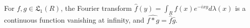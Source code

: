 For $f, g \in \mathfrak{L}_1(R)$, the Fourier transform $\hat{f}(y) = \int_R f(x) e^{-ixy} d\lambda(x)$ is a continuous function vanishing at infinity, and $\widehat{f * g} = \hat{f} \hat{g}$.
